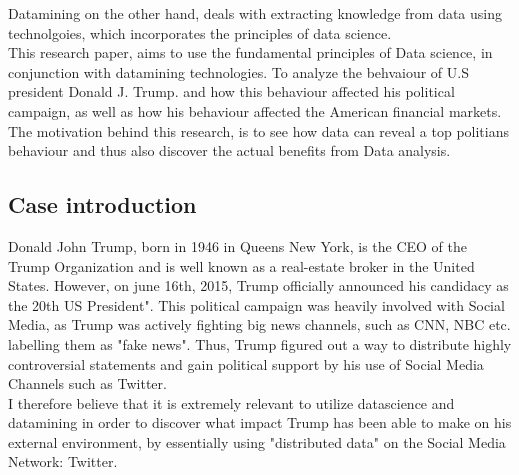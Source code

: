 \documentclass{article}
\begin{document}
Datamining on the other hand, deals with extracting knowledge from data using technolgoies, which incorporates the principles of data science.  \\

This research paper, aims to use the fundamental principles of Data science, in conjunction with  datamining technologies.  
To analyze the behvaiour of U.S president Donald J. Trump. and how this behaviour affected his political campaign, as well as how his behaviour affected the American financial markets. The motivation behind this research, is to see how data can reveal a top politians behaviour and thus also discover the actual benefits from Data analysis. 









\subsection{Case introduction}
Donald John Trump, born in 1946 in Queens New York, is the CEO of the Trump Organization and is well known as a real-estate broker in the United States.
However, on june 16th, 2015, Trump officially announced his candidacy as the 20th US President". This political campaign was heavily involved with Social Media, as Trump was actively fighting big news channels, such
as CNN, NBC etc. labelling them as "fake news". Thus, Trump figured out a way to distribute highly controversial statements and gain political support by his use of Social Media Channels such as Twitter.\\

I therefore believe that it is extremely relevant to utilize datascience and datamining in order to discover what impact Trump has been able to make on his external environment, by essentially using "distributed data" on the Social Media Network: Twitter. 




\cleardoublepage




\end{document}
